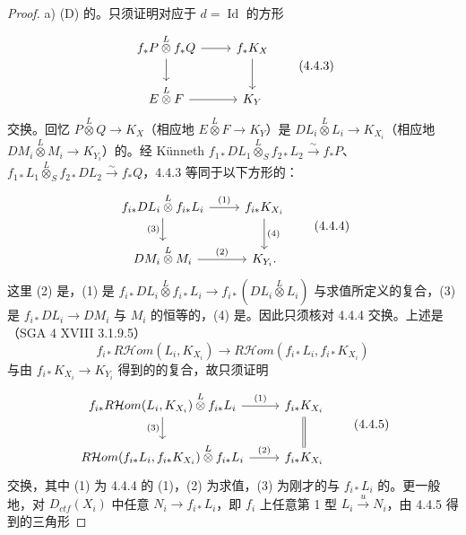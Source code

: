 \begin{proof}
 a) (D) 的。只须证明对应于 $d=\operatorname{Id}$ 的方形
\[\begin{tikzcd}
f_*P\mathbin{\overset L\otimes}f_*Q\arrow[r]\arrow[d]&f_*K_X\arrow[d]\\ E\mathbin{\overset L\otimes}F\arrow[r]&K_Y
\end{tikzcd}\tag{4.4.3}\]
交换。回忆 $P\mathbin{\overset L\otimes}Q\to K_X$（相应地 $E\mathbin{\overset L\otimes}F\to K_Y$）是 $DL_i\mathbin{\overset L\otimes}L_i\to K_{X_i}$（相应地 $DM_i\mathbin{\overset L\otimes}M_i\to K_{Y_i}$）的。经 Künneth  $f_{1*}DL_1\mathbin{\overset L\otimes}_Sf_{2*}L_2\xrightarrow\sim f_*P$、$f_{1*}L_1\mathbin{\overset L\otimes}_Sf_{2*}DL_2\xrightarrow\sim f_*Q$，4.4.3 等同于以下方形的：
\[\begin{tikzcd}
f_{i*}DL_i\mathbin{\overset L\otimes}f_{i*}L_i\arrow[r,"(1)"]\arrow[d,"(3)"']&f_{i*}K_{X_i}\arrow[d,"(4)"]\\ DM_i\mathbin{\overset L\otimes}M_i\arrow[r,"(2)"]&K_{Y_i}.
\end{tikzcd}\tag{4.4.4}\]
这里 (2) 是，(1) 是
$f_{i*}DL_i\mathbin{\overset L\otimes}f_{i*}L_i\to f_{i*}(DL_i\mathbin{\overset L\otimes}L_i)$ 与求值所定义的复合，(3) 是 $f_{i*}DL_i\to DM_i$ 与 $M_i$ 的恒等的，(4) 是。因此只须核对 4.4.4 交换。上述是（SGA 4 XVIII 3.1.9.5）
\[f_{i*}R\mathcal Hom(L_i,K_{X_i})\longrightarrow R\mathcal Hom(f_{i*}L_i,f_{i*}K_{X_i})\]
与由 $f_{i*}K_{X_i}\to K_{Y_i}$ 得到的的复合，故只须证明
\[\begin{tikzcd}
f_{i*}R\mathcal Hom(L_i,K_{X_i})\mathbin{\overset L\otimes}f_{i*}L_i\arrow[r,"(1)"]\arrow[d,"(3)"']&f_{i*}K_{X_i}\arrow[d,equal]\\ R\mathcal Hom(f_{i*}L_i,f_{i*}K_{X_i})\mathbin{\overset L\otimes}f_{i*}L_i\arrow[r,"(2)"]&f_{i*}K_{X_i}
\end{tikzcd}\tag{4.4.5}\]
交换，其中 (1) 为 4.4.4 的 (1)，(2) 为求值，(3) 为刚才的与 $f_{i*}L_i$ 的。更一般地，对 $D_{ctf}(X_i)$ 中任意 $N_i\to f_{i*}L_i$，即 $f_i$ 上任意第 1 型 $L_i\xrightarrow uN_i$，由 4.4.5 得到的三角形

\end{proof}
